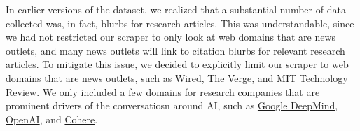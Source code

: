 In earlier versions of the dataset, we realized that a substantial number of data collected
was, in fact, blurbs for research articles. This was understandable, since we had not
restricted our scraper to only look at web domains that are news outlets,
and many news outlets will link to citation blurbs for relevant research articles.
To mitigate this issue, we decided to explicitly limit our scraper to web domains
that are news outlets, such as
\href{https://www.wired.com}{Wired},
\href{https://www.theverge.com}{The Verge}, and
\href{https://www.technologyreview.com}{MIT Technology Review}.
We only included a few domains for research companies that are prominent drivers
of the conversatiosn around AI, such as
\href{https://deepmind.google}{Google DeepMind},
\href{https://openai.com}{OpenAI},
and \href{https://txt.cohere.com}{Cohere}.
